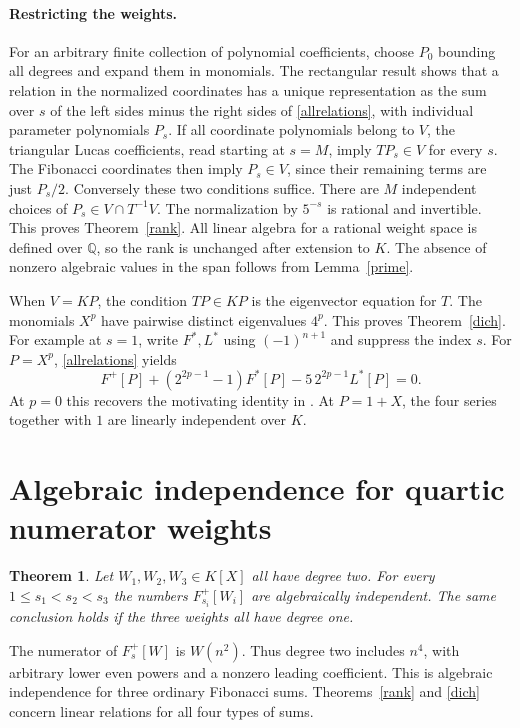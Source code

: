 \documentclass[11pt]{article}
\newtheorem{theorem}{Theorem}
\newcommand{\QQ}{\mathbb Q}
\begin{document}
\paragraph{Restricting the weights.}
For an arbitrary finite collection of polynomial coefficients, choose $P_0$ bounding all degrees and expand them in monomials. The rectangular result shows that a relation in the normalized coordinates has a unique representation as the sum over $s$ of the left sides minus the right sides of \eqref{allrelations}, with individual parameter polynomials $P_s$. If all coordinate polynomials belong to $V$, the triangular Lucas coefficients, read starting at $s=M$, imply $TP_s\in V$ for every $s$. The Fibonacci coordinates then imply $P_s\in V$, since their remaining terms are just $P_s/2$. Conversely these two conditions suffice. There are $M$ independent choices of $P_s\in V\cap T^{-1}V$. The normalization by $5^{-s}$ is rational and invertible. This proves Theorem~\ref{rank}. All linear algebra for a rational weight space is defined over $\QQ$, so the rank is unchanged after extension to $K$. The absence of nonzero algebraic values in the span follows from Lemma~\ref{prime}.

When $V=KP$, the condition $TP\in KP$ is the eigenvector equation for $T$. The monomials $X^p$ have pairwise distinct eigenvalues $4^p$. This proves Theorem~\ref{dich}. For example at $s=1$, write $F^*,L^*$ using $(-1)^{n+1}$ and suppress the index $s$. For $P=X^p$, \eqref{allrelations} yields
\[
 F^+[P]+(2^{2p-1}-1)F^*[P]-5\,2^{2p-1}L^*[P]=0.
\]
At $p=0$ this recovers the motivating identity in \cite{ET}. At $P=1+X$, the four series together with $1$ are linearly independent over $K$.

\clearpage
\section{Algebraic independence for quartic numerator weights}\label{quartic}
\begin{theorem}\label{quarticthm}
Let $W_1,W_2,W_3\in K[X]$ all have degree two. For every $1\le s_1<s_2<s_3$ the numbers $F_{s_i}^+[W_i]$ are algebraically independent. The same conclusion holds if the three weights all have degree one.
\end{theorem}
The numerator of $F_s^+[W]$ is $W(n^2)$. Thus degree two includes $n^4$, with arbitrary lower even powers and a nonzero leading coefficient. This is algebraic independence for three ordinary Fibonacci sums. Theorems~\ref{rank} and \ref{dich} concern linear relations for all four types of sums.
\end{document}
